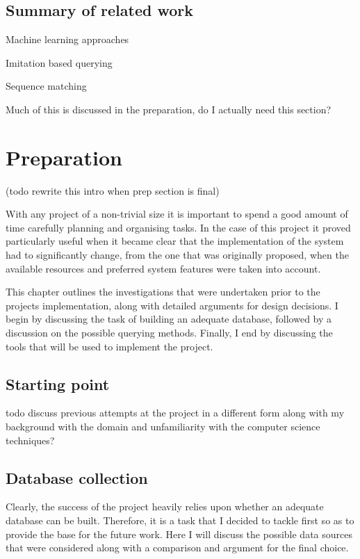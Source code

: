 \documentclass[12pt,twoside,notitlepage]{report}
\begin{document}
	
	\section{\label{sec:SummaryOfRelatedWork}Summary of related work}
	
	Machine learning approaches

	Imitation based querying

	Sequence matching
	
	Much of this is discussed in the preparation, do I actually need this section?

\cleardoublepage

\chapter{Preparation}
(todo rewrite this intro when prep section is final)

	With any project of a non-trivial size it is important to spend a good amount of time carefully planning and organising tasks. In the case of this project it proved particularly useful when it became clear that the implementation of the system had to significantly change, from the one that was originally proposed, when the available resources and preferred system features were taken into account.
	
	This chapter outlines the investigations that were undertaken prior to the projects implementation, along with detailed arguments for design decisions. I begin by discussing the task of building an adequate database, followed by a discussion on the possible querying methods. Finally, I end by discussing the tools that will be used to implement the project.
	
	
	\section{Starting point}
todo discuss previous attempts at the project in a different form along with my background with the domain and unfamiliarity with the computer science techniques?
	
	\section{Database collection}
	
	Clearly, the success of the project heavily relies upon whether an adequate database can be built. Therefore, it is a task that I decided to tackle first so as to provide the base for the future work. Here I will discuss the possible data sources that were considered along with a comparison and argument for the final choice.
	
\end{document}
